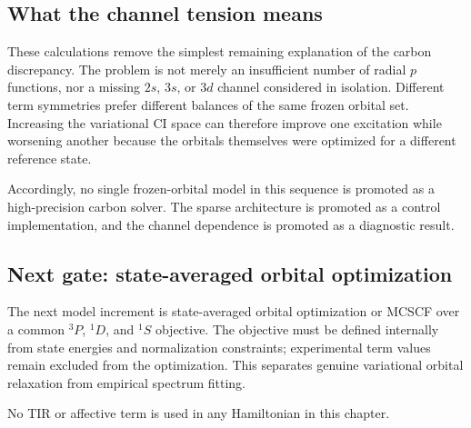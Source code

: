 \subsection{What the channel tension means}
These calculations remove the simplest remaining explanation of the carbon discrepancy.  The problem is not merely an insufficient number of radial $p$ functions, nor a missing $2s$, $3s$, or $3d$ channel considered in isolation.  Different term symmetries prefer different balances of the same frozen orbital set.  Increasing the variational CI space can therefore improve one excitation while worsening another because the orbitals themselves were optimized for a different reference state.

Accordingly, no single frozen-orbital model in this sequence is promoted as a high-precision carbon solver.  The sparse architecture is promoted as a control implementation, and the channel dependence is promoted as a diagnostic result.

\subsection{Next gate: state-averaged orbital optimization}
The next model increment is state-averaged orbital optimization or MCSCF over a common $^3P$, $^1D$, and $^1S$ objective.  The objective must be defined internally from state energies and normalization constraints; experimental term values remain excluded from the optimization.  This separates genuine variational orbital relaxation from empirical spectrum fitting.

No TIR or affective term is used in any Hamiltonian in this chapter.

